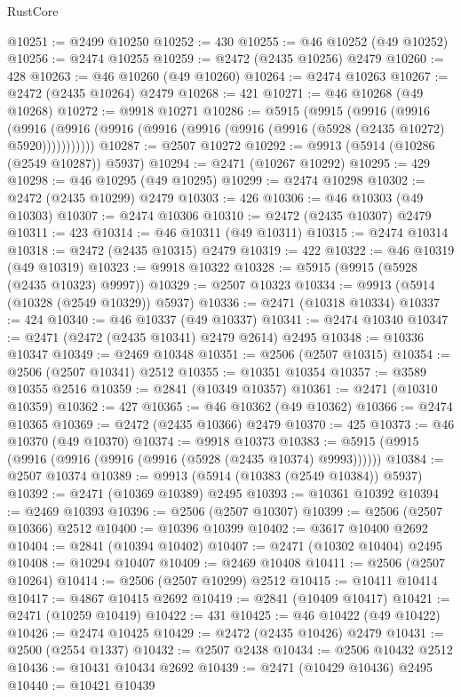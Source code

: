 \begin{lexlean}{RustCore}
\begin{coremodule}
@10251 := @2499 @10250
@10252 := 430
@10255 := @46 @10252 (@49 @10252)
@10256 := @2474 @10255
@10259 := @2472 (@2435 @10256) @2479
@10260 := 428
@10263 := @46 @10260 (@49 @10260)
@10264 := @2474 @10263
@10267 := @2472 (@2435 @10264) @2479
@10268 := 421
@10271 := @46 @10268 (@49 @10268)
@10272 := @9918 @10271
@10286 := @5915
    (@9915
      (@9916
        (@9916
          (@9916 (@9916 (@9916 (@9916 (@9916 (@9916 (@9916 (@5928 (@2435 @10272) @5920)))))))))))
@10287 := @2507 @10272
@10292 := @9913 (@5914 (@10286 (@2549 @10287)) @5937)
@10294 := @2471 (@10267 @10292)
@10295 := 429
@10298 := @46 @10295 (@49 @10295)
@10299 := @2474 @10298
@10302 := @2472 (@2435 @10299) @2479
@10303 := 426
@10306 := @46 @10303 (@49 @10303)
@10307 := @2474 @10306
@10310 := @2472 (@2435 @10307) @2479
@10311 := 423
@10314 := @46 @10311 (@49 @10311)
@10315 := @2474 @10314
@10318 := @2472 (@2435 @10315) @2479
@10319 := 422
@10322 := @46 @10319 (@49 @10319)
@10323 := @9918 @10322
@10328 := @5915 (@9915 (@5928 (@2435 @10323) @9997))
@10329 := @2507 @10323
@10334 := @9913 (@5914 (@10328 (@2549 @10329)) @5937)
@10336 := @2471 (@10318 @10334)
@10337 := 424
@10340 := @46 @10337 (@49 @10337)
@10341 := @2474 @10340
@10347 := @2471 (@2472 (@2435 @10341) @2479 @2614) @2495
@10348 := @10336 @10347
@10349 := @2469 @10348
@10351 := @2506 (@2507 @10315)
@10354 := @2506 (@2507 @10341) @2512
@10355 := @10351 @10354
@10357 := @3589 @10355 @2516
@10359 := @2841 (@10349 @10357)
@10361 := @2471 (@10310 @10359)
@10362 := 427
@10365 := @46 @10362 (@49 @10362)
@10366 := @2474 @10365
@10369 := @2472 (@2435 @10366) @2479
@10370 := 425
@10373 := @46 @10370 (@49 @10370)
@10374 := @9918 @10373
@10383 := @5915 (@9915 (@9916 (@9916 (@9916 (@9916 (@5928 (@2435 @10374) @9993))))))
@10384 := @2507 @10374
@10389 := @9913 (@5914 (@10383 (@2549 @10384)) @5937)
@10392 := @2471 (@10369 @10389) @2495
@10393 := @10361 @10392
@10394 := @2469 @10393
@10396 := @2506 (@2507 @10307)
@10399 := @2506 (@2507 @10366) @2512
@10400 := @10396 @10399
@10402 := @3617 @10400 @2692
@10404 := @2841 (@10394 @10402)
@10407 := @2471 (@10302 @10404) @2495
@10408 := @10294 @10407
@10409 := @2469 @10408
@10411 := @2506 (@2507 @10264)
@10414 := @2506 (@2507 @10299) @2512
@10415 := @10411 @10414
@10417 := @4867 @10415 @2692
@10419 := @2841 (@10409 @10417)
@10421 := @2471 (@10259 @10419)
@10422 := 431
@10425 := @46 @10422 (@49 @10422)
@10426 := @2474 @10425
@10429 := @2472 (@2435 @10426) @2479
@10431 := @2500 (@2554 @1337)
@10432 := @2507 @2438
@10434 := @2506 @10432 @2512
@10436 := @10431 @10434 @2692
@10439 := @2471 (@10429 @10436) @2495
@10440 := @10421 @10439

\end{coremodule}
\end{lexlean}
